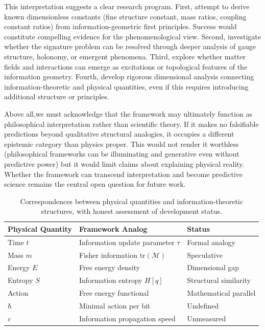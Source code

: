 \documentclass[11pt]{article}
\begin{document}
This interpretation suggests a clear research program. First, attempt to derive known dimensionless constants (fine structure constant, mass ratios, coupling constant ratios) from information-geometric first principles. Success would constitute compelling evidence for the phenomenological view. Second, investigate whether the signature problem can be resolved through deeper analysis of gauge structure, holonomy, or emergent phenomena. Third, explore whether matter fields and interactions can emerge as excitations or topological features of the information geometry. Fourth, develop rigorous dimensional analysis connecting information-theoretic and physical quantities, even if this requires introducing additional structure or principles.

Above all,we must acknowledge that the framework may ultimately function as philosophical interpretation rather than scientific theory. If it makes no falsifiable predictions beyond qualitative structural analogies, it occupies a different epistemic category than physics proper. This would not render it worthless (philosophical frameworks can be illuminating and generative even without predictive power) but it would limit claims about explaining physical reality. Whether the framework can transcend interpretation and become predictive science remains the central open question for future work.

\begin{table}[h]
\centering
\begin{tabular}{|l|l|l|}
\hline
\textbf{Physical Quantity} & \textbf{Framework Analog} & \textbf{Status} \\
\hline
Time $t$ & Information update parameter $\tau$ & Formal analogy \\
Mass $m$ & Fisher information $\mathrm{tr}(\mathcal{M})$ & Speculative \\
Energy $E$ & Free energy density & Dimensional gap \\
Entropy $S$ & Information entropy $H[q]$ & Structural similarity \\
Action & Free energy functional & Mathematical parallel \\
$\hbar$ & Minimal action per bit & Undefined \\
$c$ & Information propagation speed & Unmeasured \\
\hline
\end{tabular}
\caption{Correspondences between physical quantities and information-theoretic structures, with honest assessment of development status.}
\label{tab:physical_correspondences}
\end{table}
\end{document}
